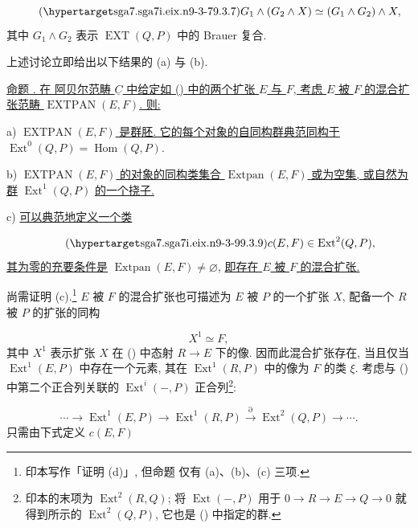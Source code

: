 \begin{equation}\tag{\SGARefTarget{sga7.sga7i.eix.n9-3-7}{9.3.7}}
G_1\wedge(G_2\wedge X)
 \simeq (G_1\wedge G_2)\wedge X,
\end{equation}
其中 $G_1\wedge G_2$ 表示 $\operatorname{EXT}(Q,P)$ 中的 Brauer 复合.

上述讨论立即给出以下结果的 (a) 与 (b).

\medskip
\noindent
\underline{命题 . 在 阿贝尔范畴 $\underline C$ 中给定如 () 中的两个扩张 $E$ 与 $F$, 考虑 $E$ 被 $F$ 的混合扩张范畴 $\operatorname{EXTPAN}(E,F)$. 则:}

\smallskip
\noindent
a) \underline{$\operatorname{EXTPAN}(E,F)$ 是群胚. 它的每个对象的自同构群典范同构于} $\operatorname{Ext}^0(Q,P)=\operatorname{Hom}(Q,P)$.

\smallskip
\noindent
b) \underline{$\operatorname{EXTPAN}(E,F)$ 的对象的同构类集合 $\operatorname{Extpan}(E,F)$ 或为空集, 或自然为群} $\operatorname{Ext}^1(Q,P)$ \underline{的一个挠子.}

\smallskip
\noindent
c) \underline{可以典范地定义一个类}

\begin{equation}\tag{\SGARefTarget{sga7.sga7i.eix.n9-3-9}{9.3.9}}
c(E,F)\in\operatorname{Ext}^2(Q,P),
\end{equation}
\underline{其为零的充要条件是} $\operatorname{Extpan}(E,F)\neq\varnothing$, \underline{即存在 $E$ 被 $F$ 的混合扩张.}

尚需证明 (c).\footnote{印本写作「证明 (d)」, 但命题  仅有 (a)、(b)、(c) 三项.} $E$ 被 $F$ 的混合扩张也可描述为 $E$ 被 $P$ 的一个扩张 $X$, 配备一个 $R$ 被 $P$ 的扩张的同构

\begin{equation*}
X^1\simeq F,
\end{equation*}
其中 $X^1$ 表示扩张 $X$ 在 () 中态射 $R\longrightarrow E$ 下的像. 因而此混合扩张存在, 当且仅当 $\operatorname{Ext}^1(E,P)$ 中存在一个元素, 其在 $\operatorname{Ext}^1(R,P)$ 中的像为 $F$ 的类 $\xi$. 考虑与 () 中第二个正合列关联的 $\operatorname{Ext}^i(-,P)$ 正合列\footnote{印本的末项为 $\operatorname{Ext}^2(R,Q)$; 将 $\operatorname{Ext}(-,P)$ 用于 $0\to R\to E\to Q\to0$ 就得到所示的 $\operatorname{Ext}^2(Q,P)$, 它也是 () 中指定的群.}:

\begin{equation*}
\cdots\longrightarrow
\operatorname{Ext}^1(E,P)\longrightarrow
\operatorname{Ext}^1(R,P)
\xrightarrow{\partial}
\operatorname{Ext}^2(Q,P)\longrightarrow\cdots .
\end{equation*}
只需由下式定义 $c(E,F)$

